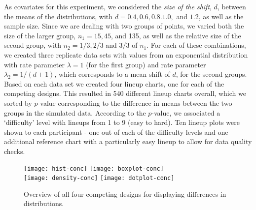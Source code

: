 As covariates for this experiment, we considered the {\it size of the shift}, $d$, between the means of the distributions, with $d=0.4, 0.6, 0.8. 1.0,$ and $1.2$, as well as the sample size.  Since we are dealing with two groups of points, we varied both the size of the larger group, $n_1 = 15, 45$, and 135, as well as the relative size of the second group, with $n_2 = 1/3, 2/3$ and $3/3$ of $n_1$. 
For each of these combinations, we created three replicate data sets with values from an exponential distribution with rate parameter $\lambda=1$ (for the first group) and rate parameter $\lambda_2=1/(d+1)$, which corresponds to a mean shift of $d$, for the second groups. 
Based on each data set we created four lineup charts, one for each of the competing designs. This resulted in 540 different lineup charts overall, which we sorted by $p$-value corresponding to the difference in means between the two groups in the simulated data. According to the $p$-value, we associated a `difficulty' level with lineups from 1 to 9 (easy to hard). Ten lineup plots were shown to each participant - one out of each of the difficulty levels and one additional reference chart with a particularly easy lineup  to allow for data quality checks.
\begin{figure} [hbtp]
   \centering
   \texttt{[image: hist-conc]} 
   \texttt{[image: boxplot-conc]} \\
   \texttt{[image: density-conc]} 
   \texttt{[image: dotplot-conc]} 
   \caption{Overview of all four competing designs for displaying differences in distributions.}
   \label{fig:expii}
\end{figure}

